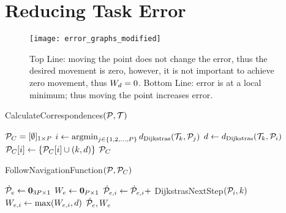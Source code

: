 \section{Reducing Task Error}
\label{sec:reducing_error}

\begin{figure}[t]
    \centering
    \texttt{[image: error\_graphs\_modified]}
    \caption{Top Line: moving the point does not change the error, thus the desired movement is zero, however, it is not important to achieve zero movement, thus $W_d = 0$.  Bottom Line: error is at a local minimum; thus moving the point increases error.}
    \label{fig:error_examples}
\end{figure}

\begin{algorithm}[t]
\caption{CalculateCorrespondences$(\mathcal{P}, \mathcal{T})$}
\begin{algorithmic}[1]
    \State $\mathcal{P}_C = [ \emptyset ]_{1 \times P}$
        \State $i \gets \operatorname*{argmin}_{j \in \{ 1, 2, \dots, P \}} d_\textrm{Dijkstras}(\mathcal{T}_k, \mathcal{P}_j)$
        \State $d \gets d_\textrm{Dijkstras}(\mathcal{T}_k, \mathcal{P}_i)$
        \State $\mathcal{P}_C[i] \gets \{ \mathcal{P}_C[i] \cup (k, d)\}$
    \EndFor
    \State \Return $\mathcal{P}_C$
\end{algorithmic}
\label{alg:calculate_correspondences}
\end{algorithm}

\begin{algorithm}[t]
\caption{FollowNavigationFunction$(\mathcal{P}, \mathcal{P}_C)$}
\begin{algorithmic}[1]
    \State $\dot{\mathcal{P}}_e \gets \mathbf{0}_{{3P} \times 1}$
    \State $W_e \gets \mathbf{0}_{P \times 1}$
            \State $\dot{\mathcal{P}}_{e,i} \gets \dot{\mathcal{P}}_{e,i} +$ DijkstrasNextStep$(\mathcal{P}_i, k)$ \label{alg:follow_nav:accumulate}
            \State $W_{e,i} \gets \max(W_{e,i}, d)$ \label{alg:follow_nav:max}
        \EndFor
    \EndFor
    \State \Return $\dot{\mathcal{P}}_e, W_e$
\end{algorithmic}
\label{alg:follow_nav_function}
\end{algorithm}

